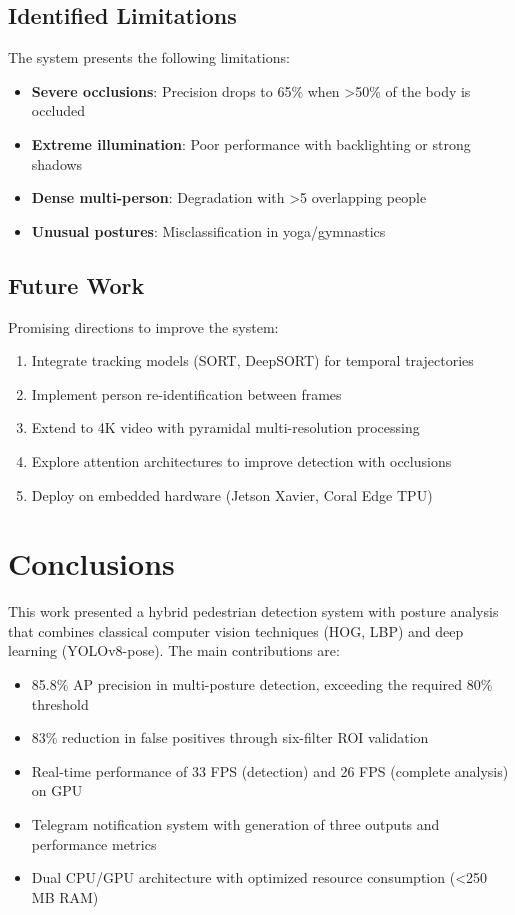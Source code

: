 \documentclass[conference]{IEEEtran}
\begin{document}
\subsection{Identified Limitations}

The system presents the following limitations:

\begin{itemize}
    \item \textbf{Severe occlusions}: Precision drops to 65\% when >50\% of the body is occluded
    \item \textbf{Extreme illumination}: Poor performance with backlighting or strong shadows
    \item \textbf{Dense multi-person}: Degradation with >5 overlapping people
    \item \textbf{Unusual postures}: Misclassification in yoga/gymnastics
\end{itemize}

\subsection{Future Work}

Promising directions to improve the system:

\begin{enumerate}
    \item Integrate tracking models (SORT, DeepSORT) for temporal trajectories
    \item Implement person re-identification between frames
    \item Extend to 4K video with pyramidal multi-resolution processing
    \item Explore attention architectures to improve detection with occlusions
    \item Deploy on embedded hardware (Jetson Xavier, Coral Edge TPU)
\end{enumerate}

\section{Conclusions}

This work presented a hybrid pedestrian detection system with posture analysis that combines classical computer vision techniques (HOG, LBP) and deep learning (YOLOv8-pose). The main contributions are:

\begin{itemize}
    \item 85.8\% AP precision in multi-posture detection, exceeding the required 80\% threshold
    \item 83\% reduction in false positives through six-filter ROI validation
    \item Real-time performance of 33 FPS (detection) and 26 FPS (complete analysis) on GPU
    \item Telegram notification system with generation of three outputs and performance metrics
    \item Dual CPU/GPU architecture with optimized resource consumption (<250 MB RAM)
\end{itemize}
\end{document}
